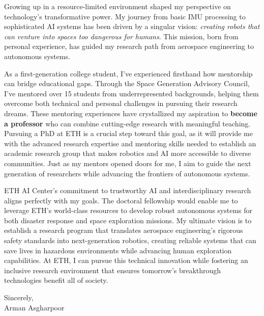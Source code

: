 \documentclass[12pt]{article}
\begin{document}
Growing up in a resource-limited environment shaped my perspective on technology's transformative power. My journey from basic IMU processing to sophisticated AI systems has been driven by a singular vision: \textit{creating robots that can venture into spaces too dangerous for humans}. This mission, born from personal experience, has guided my research path from aerospace engineering to autonomous systems.

As a first-generation college student, I've experienced firsthand how mentorship can bridge educational gaps. Through the Space Generation Advisory Council, I've mentored over 15 students from underrepresented backgrounds, helping them overcome both technical and personal challenges in pursuing their research dreams. These mentoring experiences have crystallized my aspiration to \textbf{become a professor} who can combine cutting-edge research with meaningful teaching. Pursuing a PhD at ETH is a crucial step toward this goal, as it will provide me with the advanced research expertise and mentoring skills needed to establish an academic research group that makes robotics and AI more accessible to diverse communities. Just as my mentors opened doors for me, I aim to guide the next generation of researchers while advancing the frontiers of autonomous systems.

ETH AI Center's commitment to trustworthy AI and interdisciplinary research aligns perfectly with my goals. The doctoral fellowship would enable me to leverage ETH's world-class resources to develop robust autonomous systems for both disaster response and space exploration missions. My ultimate vision is to establish a research program that translates aerospace engineering's rigorous safety standards into next-generation robotics, creating reliable systems that can save lives in hazardous environments while advancing human exploration capabilities. At ETH, I can pursue this technical innovation while fostering an inclusive research environment that ensures tomorrow's breakthrough technologies benefit all of society.

\vspace{1em}

Sincerely,\\
Arman Asgharpoor
\end{document}
